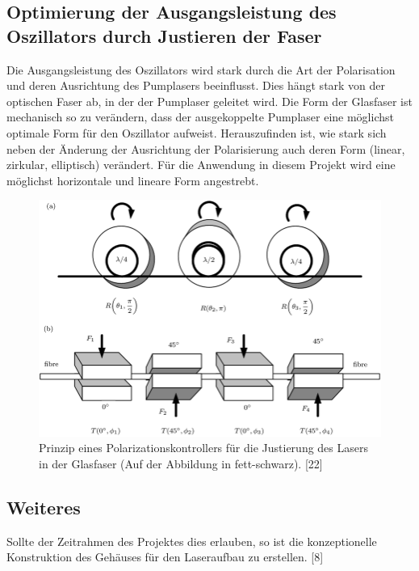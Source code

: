 \subsection{Optimierung der Ausgangsleistung des Oszillators durch Justieren der Faser}
Die Ausgangsleistung des Oszillators wird stark durch die Art der Polarisation und deren Ausrichtung des Pumplasers beeinflusst. Dies hängt stark von der optischen Faser ab, in der der Pumplaser geleitet wird. Die Form der Glasfaser ist mechanisch so zu verändern, dass der ausgekoppelte Pumplaser eine möglichst optimale Form für den Oszillator aufweist. Herauszufinden ist, wie stark sich neben der Änderung der Ausrichtung der Polarisierung auch deren Form (linear, zirkular, elliptisch) verändert. Für die Anwendung in diesem Projekt wird eine möglichst horizontale und lineare Form angestrebt.\\  %

\begin{figure}[H]
    \centering
    \includegraphics[scale=0.4, trim={15mm 125mm 0 0},clip]{98_images/laser_plarizationcontroller.png}
    \caption{Prinzip eines Polarizationskontrollers für die Justierung des Lasers in der Glasfaser (Auf der Abbildung in fett-schwarz). [22]}
    \label{fig:polarizationcontroller}
\end{figure}


\subsection{Weiteres}
Sollte der Zeitrahmen des Projektes dies erlauben, so ist die konzeptionelle Konstruktion des Gehäuses für den Laseraufbau zu erstellen. [8]